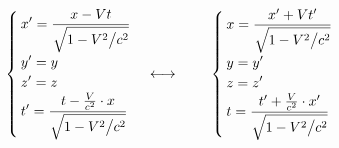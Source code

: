     \[
        \begin{cases} 
            \displaystyle x' = \frac{x - V t}{\sqrt{1 - V^2 \big/ c^2}} \\
            \displaystyle y' = y \\
            \displaystyle z' = z \\
            \displaystyle t' = \frac{t - \frac{V}{c^2} \cdot x}{\sqrt{1 - V^2 \big/ c^2}}
        \end{cases}
        \longleftrightarrow \hspace{0.8cm}
        \begin{cases}
            \displaystyle x = \frac{x' + V t'}{\sqrt{1 - V^2 \big/ c^2}} \\
            \displaystyle y = y' \\
            \displaystyle z = z' \\
            \displaystyle t = \frac{t' + \frac{V}{c^2} \cdot x'}{\sqrt{1 - V^2 \big/ c^2}}
        \end{cases}
    \]

